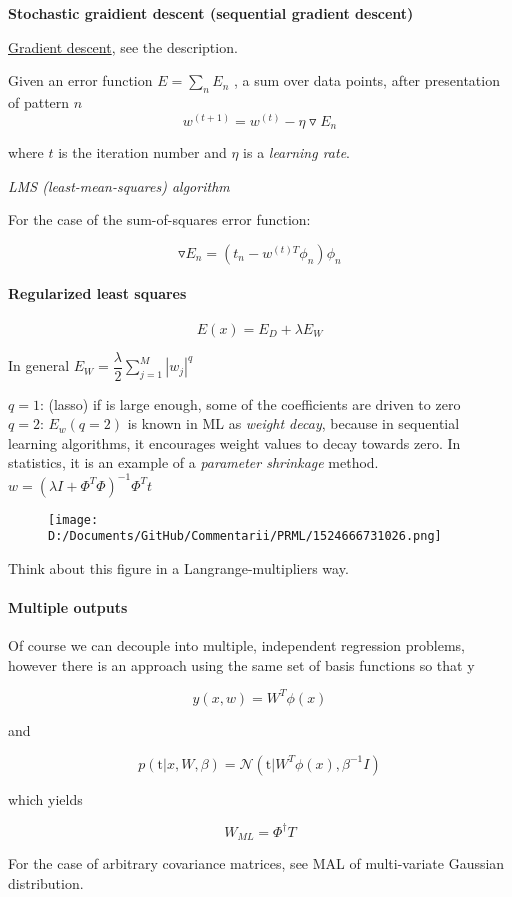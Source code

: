 \documentclass[]{article}
\let\oldparagraph\paragraph
\renewcommand{\paragraph}[1]{\oldparagraph{#1}\mbox{}}
\begin{document}
\textbf{Stochastic graidient descent (sequential gradient descent)}

\href{https://en.wikipedia.org/wiki/Gradient_descent}{Gradient descent},
see the description.

Given an error function \(E=\sum_n E_n\) , a sum over data points, after
presentation of pattern \(n\)\\

\[w^{(t+1)}=w^{(t)}-\eta\triangledown E_n\]

where \(t\) is the iteration number and \(\eta\) is a \emph{learning
rate}.

\emph{LMS (least-mean-squares) algorithm}

For the case of the sum-of-squares error function:

\[\triangledown E_n=(t_n-w^{(t)T}\phi_n)\phi_n\]

\paragraph{Regularized least squares}\label{header-n70}

\[E(x)=E_D+\lambda E_W\]

In general \(E_W=\dfrac{\lambda}{2}\sum\limits^M_{j=1}|w_j|^q\)

\(q=1\): (lasso) if is large enough, some of the coefficients are driven
to zero\\
 \(q=2\): \(E_w(q=2)\) is known in ML as \emph{weight decay}, because in
sequential learning algorithms, it encourages weight values to decay
towards zero. In statistics, it is an example of a \emph{parameter
shrinkage} method. \(w=(\lambda I+\Phi^T\Phi)^{-1}\Phi^Tt\)

\begin{figure}
\centering
\texttt{[image: D:/Documents/GitHub/Commentarii/PRML/1524666731026.png]}
\caption{}
\end{figure}

Think about this figure in a Langrange-multipliers way.

\paragraph{Multiple outputs}\label{header-n81}

Of course we can decouple into multiple, independent regression
problems, however there is an approach using the same set of basis
functions so that y

\[y(x,w)=W^T\phi(x)\]

and

\[p(\mathrm{t}|x,W,\beta)=\mathcal{N}(\mathrm{t}|W^T\phi(x),\beta^{-1}I)\]

which yields

\[W_{ML}=\Phi^\dagger T\]

For the case of arbitrary covariance matrices, see MAL of multi-variate
Gaussian distribution.
\end{document}
